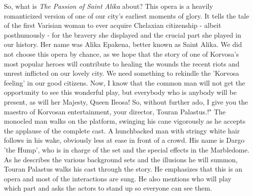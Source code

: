 So, what is {\itshape The Passion of Saint Alika} about? This opera is a heavily romanticized version of one of our city's earliest moments of glory. It tells the tale of the first Varisian woman to ever acquire Chelaxian citizenship - albeit posthumously - for the bravery she displayed and the crucial part she played in our history. Her name was Alika Epakena, better known as Saint Alika. We did not choose this opera by chance, as we hope that the story of one of Korvosa's most popular heroes will contribute to healing the wounds the recent riots and unrest inflicted on our lovely city. We need something to rekindle the 'Korvosa feeling' in our good citizens. Now, I know that the common man will not get the opportunity to see this wonderful play, but everybody who is anybody will be present, as will her Majesty, Queen Ileosa! So, without further ado, I give you the maestro of Korvosan entertainment, your director, Touran Palastus.!" The monocled man walks on the platform, swinging his cane vigorously as he accepts the applause of the complete cast. A hunchbacked man with stringy white hair follows in his wake, obviously less at ease in front of a crowd. His name is Dargo 'the Hump', who is in charge of the set and the special effects in the Marbledome. As he describes the various background sets and the illusions he will summon, Touran Palastus walks his cast through the story. He emphasizes that this is an opera and most of the interactions are sung. He also mentions who will play which part and asks the actors to stand up so everyone can see them.\\


